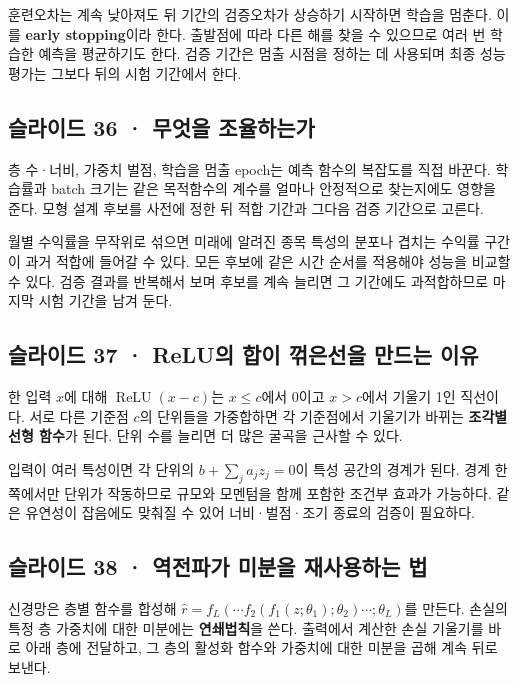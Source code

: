 \documentclass[11pt,a4paper]{article}
\begin{document}
훈련오차는 계속 낮아져도 뒤 기간의 검증오차가 상승하기 시작하면 학습을 멈춘다. 이를 \textbf{early stopping}이라 한다. 출발점에 따라 다른 해를 찾을 수 있으므로 여러 번 학습한 예측을 평균하기도 한다. 검증 기간은 멈출 시점을 정하는 데 사용되며 최종 성능 평가는 그보다 뒤의 시험 기간에서 한다.\par

\subsection{슬라이드 36 · 무엇을 조율하는가}
층 수·너비, 가중치 벌점, 학습을 멈출 epoch는 예측 함수의 복잡도를 직접 바꾼다. 학습률과 batch 크기는 같은 목적함수의 계수를 얼마나 안정적으로 찾는지에도 영향을 준다. 모형 설계 후보를 사전에 정한 뒤 적합 기간과 그다음 검증 기간으로 고른다.\par

월별 수익률을 무작위로 섞으면 미래에 알려진 종목 특성의 분포나 겹치는 수익률 구간이 과거 적합에 들어갈 수 있다. 모든 후보에 같은 시간 순서를 적용해야 성능을 비교할 수 있다. 검증 결과를 반복해서 보며 후보를 계속 늘리면 그 기간에도 과적합하므로 마지막 시험 기간을 남겨 둔다.\par

\subsection{슬라이드 37 · ReLU의 합이 꺾은선을 만드는 이유}
한 입력 $x$에 대해 $\operatorname{ReLU}(x-c)$는 $x\le c$에서 0이고 $x>c$에서 기울기 1인 직선이다. 서로 다른 기준점 $c$의 단위들을 가중합하면 각 기준점에서 기울기가 바뀌는 \textbf{조각별 선형 함수}가 된다. 단위 수를 늘리면 더 많은 굴곡을 근사할 수 있다.\par

입력이 여러 특성이면 각 단위의 $b+\sum_ja_jz_j=0$이 특성 공간의 경계가 된다. 경계 한쪽에서만 단위가 작동하므로 규모와 모멘텀을 함께 포함한 조건부 효과가 가능하다. 같은 유연성이 잡음에도 맞춰질 수 있어 너비·벌점·조기 종료의 검증이 필요하다.\par

\subsection{슬라이드 38 · 역전파가 미분을 재사용하는 법}
신경망은 층별 함수를 합성해 $\hat r=f_L(\cdots f_2(f_1(z;\theta_1);\theta_2)\cdots;\theta_L)$를 만든다. 손실의 특정 층 가중치에 대한 미분에는 \textbf{연쇄법칙}을 쓴다. 출력에서 계산한 손실 기울기를 바로 아래 층에 전달하고, 그 층의 활성화 함수와 가중치에 대한 미분을 곱해 계속 뒤로 보낸다.\par
\end{document}
